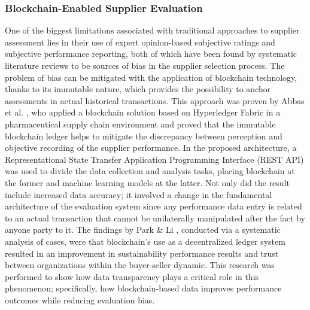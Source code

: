 \documentclass[11pt]{article}
\begin{document}
\subsubsection{Blockchain-Enabled Supplier Evaluation}

One of the biggest limitations associated with traditional approaches to supplier assessment lies in their use of expert opinion-based subjective ratings and subjective performance reporting, both of which have been found by systematic literature reviews to be sources of bias in the supplier selection process. The problem of bias can be mitigated with the application of blockchain technology, thanks to its immutable nature, which provides the possibility to anchor assessments in actual historical transactions. This approach was proven by Abbas et al. \cite{ref19}, who applied a blockchain solution based on Hyperledger Fabric in a pharmaceutical supply chain environment and proved that the immutable blockchain ledger helps to mitigate the discrepancy between perception and objective recording of the supplier performance. In the proposed architecture, a Representational State Transfer Application Programming Interface (REST API) was used to divide the data collection and analysis tasks, placing blockchain at the former and machine learning models at the latter. Not only did the result include increased data accuracy; it involved a change in the fundamental architecture of the evaluation system since any performance data entry is related to an actual transaction that cannot be unilaterally manipulated after the fact by anyone party to it. The findings by Park \& Li \cite{ref65}, conducted via a systematic analysis of cases, were that blockchain's use as a decentralized ledger system resulted in an improvement in sustainability performance results and trust between organizations within the buyer-seller dynamic. This research was performed to show how data transparency plays a critical role in this phenomenon; specifically, how blockchain-based data improves performance outcomes while reducing evaluation bias.
\end{document}
